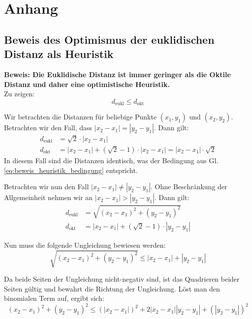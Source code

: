 \chapter{Anhang}
\label{ch:appendix}
\section{Beweis des Optimismus der euklidischen Distanz als Heuristik}
\label{sec:beweis_heuristik}
\textbf{Beweis: Die Euklidische Distanz ist immer geringer als die Oktile Distanz und daher eine optimistische Heuristik.} \\
Zu zeigen:
\begin{equation}
    \label{eq:beweis_heuristik_bedingung}
    d_\text{eukl} \leq d_\text{okt}
\end{equation}

Wir betrachten die Distanzen für beliebige Punkte $(x_1, y_1)$ und $(x_2, y_2)$.\\
Betrachten wir den Fall, dass  $|x_2 - x_1| = |y_2 - y_1|$.
Dann gilt:
\begin{align*}
    d_\text{eukl} &= \sqrt{2} \cdot |x_2 - x_1|\\
    d_\text{okt} &= |x_2 - x_1| + (\sqrt{2}-1) \cdot |x_2 - x_1| = |x_2 - x_1| \cdot \sqrt{2}
\end{align*}
In diesem Fall sind die Distanzen identisch, was der Bedingung aus Gl. \ref{eq:beweis_heuristik_bedingung} entspricht.

Betrachten wir nun den Fall $|x_2 - x_1| \neq |y_2 - y_1|$.
Ohne Beschränkung der Allgemeinheit nehmen wir an $|x_2 - x_1| > |y_2 - y_1|$.
Dann gilt:
\begin{align*}
    d_\text{eukl} &= \sqrt{(x_2 - x_1)^2 + (y_2 - y_1)^2}\\
    d_\text{okt} &= |x_2 - x_1| + (\sqrt{2}-1) \cdot |y_2 - y_1|
\end{align*}

Nun muss die folgende Ungleichung bewiesen werden:
\begin{equation*}
    \sqrt{(x_2 - x_1)^2 + (y_2 - y_1)^2} \leq |x_2 - x_1| + |y_2 - y_1|
\end{equation*}

Da beide Seiten der Ungleichung nicht-negativ sind, ist das Quadrieren beider Seiten gültig und bewahrt die Richtung der Ungleichung.
Löst man den binomialen Term auf, ergibt sich:
\begin{equation*}
(x_2 - x_1)^2 + (y_2 - y_1)^2 \leq \left(|x_2 - x_1|\right)^2 + 2|x_2 - x_1||y_2 - y_1| + \left(|y_2 - y_1|\right)^2
\end{equation*}

